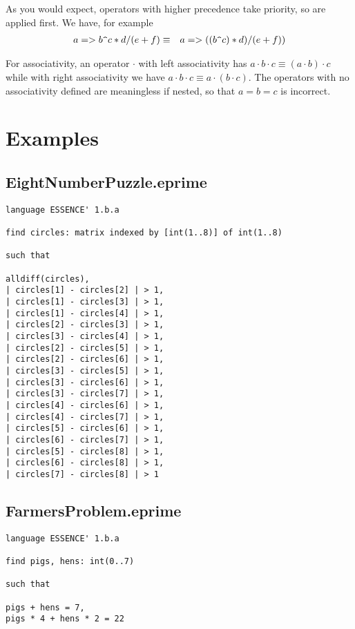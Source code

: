\documentclass{article}
\begin{document}
As you would expect, operators with higher precedence take priority, so are applied first.   We have, for example 
\begin{eqnarray*}
a => b \verb.^. c * d / ( e + f ) & \equiv & a => ( (b \verb.^. c) * d ) /  (e + f) )
\end{eqnarray*}

For associativity, an operator $\cdot$ with left associativity has 
$a \cdot b \cdot c \equiv  ( a \cdot b) \cdot c$ while with right associativity we have 
$a \cdot b \cdot  c \equiv a \cdot (b \cdot c)$.   The operators with no associativity defined are meaningless if nested, so that $a = b = c$ is incorrect.    



\section{Examples} 

\subsection{EightNumberPuzzle.eprime}
\begin{verbatim}
language ESSENCE' 1.b.a

find circles: matrix indexed by [int(1..8)] of int(1..8)

such that

alldiff(circles),
| circles[1] - circles[2] | > 1,
| circles[1] - circles[3] | > 1,
| circles[1] - circles[4] | > 1,
| circles[2] - circles[3] | > 1,
| circles[3] - circles[4] | > 1,
| circles[2] - circles[5] | > 1,
| circles[2] - circles[6] | > 1,
| circles[3] - circles[5] | > 1,
| circles[3] - circles[6] | > 1,
| circles[3] - circles[7] | > 1,
| circles[4] - circles[6] | > 1,
| circles[4] - circles[7] | > 1,
| circles[5] - circles[6] | > 1,
| circles[6] - circles[7] | > 1,
| circles[5] - circles[8] | > 1,
| circles[6] - circles[8] | > 1,
| circles[7] - circles[8] | > 1
\end{verbatim}

\subsection{FarmersProblem.eprime}
\begin{verbatim}
language ESSENCE' 1.b.a

find pigs, hens: int(0..7)

such that

pigs + hens = 7,
pigs * 4 + hens * 2 = 22
\end{verbatim}
\end{document}
